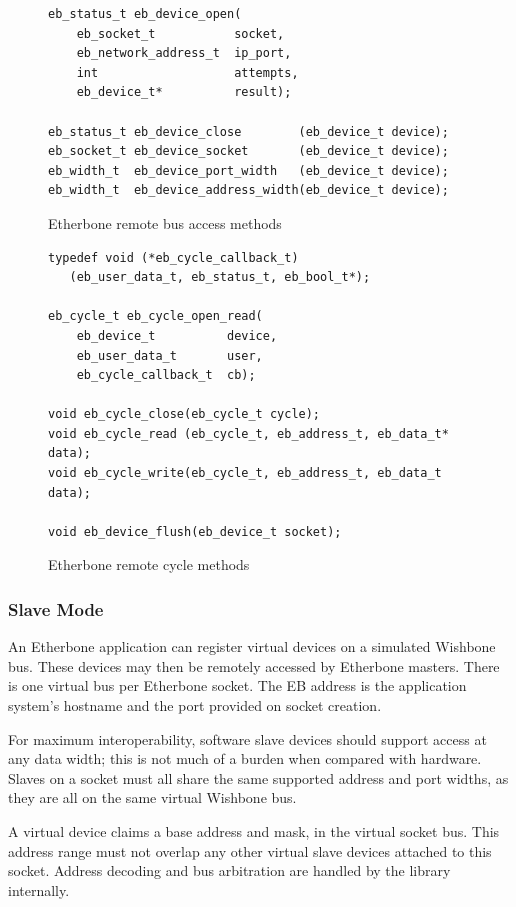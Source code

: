 \documentclass{article}
\begin{document}
\begin{figure}
\centering
\begin{lstlisting}
eb_status_t eb_device_open(
    eb_socket_t           socket, 
    eb_network_address_t  ip_port, 
    int                   attempts,
    eb_device_t*          result);

eb_status_t eb_device_close        (eb_device_t device);
eb_socket_t eb_device_socket       (eb_device_t device);
eb_width_t  eb_device_port_width   (eb_device_t device);
eb_width_t  eb_device_address_width(eb_device_t device);   
\end{lstlisting}
\caption{Etherbone remote bus access methods}
\label{fig:devicem}
\end{figure}

\begin{figure}
\centering
\begin{lstlisting}
typedef void (*eb_cycle_callback_t)
   (eb_user_data_t, eb_status_t, eb_bool_t*);

eb_cycle_t eb_cycle_open_read(
    eb_device_t          device,
    eb_user_data_t       user,  
    eb_cycle_callback_t  cb);

void eb_cycle_close(eb_cycle_t cycle);
void eb_cycle_read (eb_cycle_t, eb_address_t, eb_data_t* data);
void eb_cycle_write(eb_cycle_t, eb_address_t, eb_data_t  data);

void eb_device_flush(eb_device_t socket);
\end{lstlisting}
\caption{Etherbone remote cycle methods}
\label{fig:cyclem}
\end{figure}

\subsubsection{Slave Mode}

An Etherbone application can register virtual devices on a simulated Wishbone bus.
These devices may then be remotely accessed by Etherbone masters.
There is one virtual bus per Etherbone socket.
The EB address is the application system's hostname and the
port provided on socket creation.

For maximum interoperability, 
software slave devices should support access at any data width;
this is not much of a burden when compared with hardware.
Slaves on a socket must all share the same supported address and port widths, 
as they are all on the same virtual Wishbone bus.
 
A virtual device claims a base address and mask,
in the virtual socket bus.
This address range must not overlap 
any other virtual slave devices attached to this socket.
Address decoding and bus arbitration are handled by the library internally.
\end{document}
